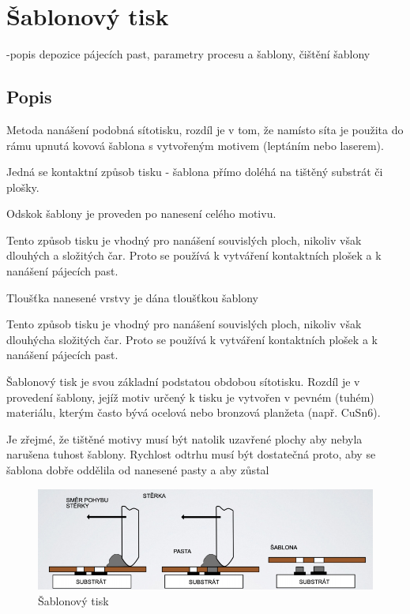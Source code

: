 \section{Šablonový tisk}
-popis depozice pájecích past, parametry procesu a šablony, čištění
šablony

\subsection{Popis}
Metoda nanášení podobná sítotisku, rozdíl je v tom, že namísto síta je použita do rámu upnutá kovová šablona s vytvořeným motivem (leptáním nebo laserem).

Jedná se kontaktní způsob tisku - šablona přímo doléhá na tištěný substrát či plošky.

Odskok šablony je proveden po nanesení celého motivu.

Tento způsob tisku je vhodný pro nanášení souvislých ploch, nikoliv však dlouhých a složitých čar. Proto se používá k vytváření kontaktních plošek a k nanášení pájecích past.

Tloušťka nanesené vrstvy je dána tloušťkou šablony

Tento způsob tisku je vhodný pro nanášení souvislých ploch, nikoliv však dlouhýcha
složitých čar. Proto se používá k vytváření kontaktních plošek a k nanášení pájecích
past.

Šablonový tisk je svou základní podstatou obdobou sítotisku. Rozdíl je
v provedení šablony, jejíž motiv určený k tisku je vytvořen v pevném
(tuhém) materiálu, kterým často bývá ocelová nebo bronzová planžeta
(např. CuSn6).

Je zřejmé, že tištěné motivy musí být natolik uzavřené plochy aby
nebyla narušena tuhost šablony. Rychlost odtrhu musí být dostatečná
proto, aby se šablona dobře oddělila od nanesené pasty a aby zůstal

\begin{figure}[h]
   \begin{center}
     \includegraphics[scale=0.6]{images/SablonaTisk.png}
   \end{center}
   \caption{Šablonový tisk}
\end{figure}
